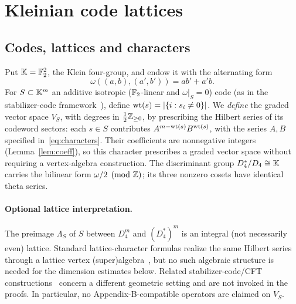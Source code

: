 \documentclass[10pt,a4paper]{article}
\numberwithin{equation}{section}
\theoremstyle{remark}\newtheorem{remark}[theorem]{Remark}\newtheorem{question}[theorem]{Question}
\begin{document}
\section{Kleinian code lattices}\label{sec:codes}
\subsection{Codes, lattices and characters}
Put $\mathbb K=\mathbb F_2^2$, the Klein four-group, and endow it with the alternating form
\[\omega((a,b),(a',b'))=ab'+a'b.\]
For $S\subset\mathbb K^m$ an additive isotropic ($\mathbb F_2$-linear and $\omega|_S=0$) code
(as in the stabilizer-code framework~\cite{calderbank}), define $\mathrm{wt}(s)=|\{i:s_i\ne0\}|$. We \emph{define} the graded vector space $V_S$, with degrees in $\frac12\mathbb Z_{\ge0}$, by prescribing the Hilbert series of its codeword sectors: each $s\in S$ contributes $A^{m-\mathrm{wt}(s)}B^{\mathrm{wt}(s)}$, with the series $A,B$ specified in~\eqref{eq:characters}. Their coefficients are nonnegative integers (Lemma~\ref{lem:coeff}), so this character prescribes a graded vector space without requiring a vertex-algebra construction. The discriminant group $D_4^*/D_4\cong\mathbb K$ carries the bilinear form $\omega/2\pmod{\mathbb Z}$; its three nonzero cosets have identical theta series.
\paragraph{Optional lattice interpretation.}
The preimage $\Lambda_S$ of $S$ between $D_4^m$ and $(D_4^*)^m$ is an integral (not necessarily even) lattice. Standard lattice-character formulas realize the same Hilbert series through a lattice vertex (super)algebra~\cite{hoehn,conwaysloane}, but no such algebraic structure is needed for the dimension estimates below.
Related stabilizer-code/CFT constructions~\cite{dymarsky} concern a different
geometric setting and are not invoked in the proofs. In particular, no Appendix-B-compatible operators are claimed on $V_S$.
\end{document}
